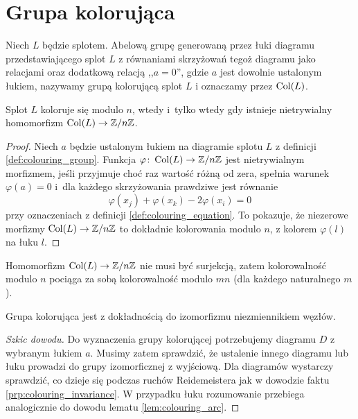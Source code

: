 
\section{Grupa kolorująca}
%

\begin{definition}
\label{def:colouring_group}%
    Niech $L$ będzie splotem.
    Abelową grupę generowaną przez łuki diagramu przedstawiającego splot $L$ z równaniami skrzyżowań tegoż diagramu jako relacjami oraz dodatkową relacją ,,$a = 0$'', gdzie $a$ jest dowolnie ustalonym łukiem, nazywamy grupą kolorującą splot $L$ i oznaczamy przez $\operatorname{Col} (L)$.
\end{definition}

\begin{proposition}
\label{prp:colourings_are_morphisms}%
    Splot $L$ koloruje się modulo $n$, wtedy i~tylko wtedy gdy istnieje nietrywialny homomorfizm $\operatorname{Col}(L) \to \mathbb Z/n\mathbb Z$.
\end{proposition}

\begin{proof}
    Niech $a$ będzie ustalonym łukiem na diagramie splotu $L$ z definicji \ref{def:colouring_group}.
    Funkcja $\varphi \colon \operatorname{Col}(L) \to \mathbb Z/n\mathbb Z$ jest nietrywialnym morfizmem, jeśli przyjmuje choć raz wartość różną od zera, spełnia warunek $\varphi(a) = 0$ i~dla każdego skrzyżowania prawdziwe jest równanie
    \begin{equation}
        \varphi(x_j) + \varphi(x_k) - 2\varphi(x_i) = 0
    \end{equation}
    przy oznaczeniach z definicji \ref{def:colouring_equation}.
    To pokazuje, że niezerowe morfizmy $\operatorname{Col}(L) \to \mathbb Z/n\mathbb Z$ to dokładnie kolorowania modulo $n$, z kolorem $\varphi(l)$ na łuku $l$.
\end{proof}

Homomorfizm $\operatorname{Col} (L) \to \mathbb Z/n\mathbb Z$ nie musi być surjekcją, zatem kolorowalność modulo $n$ pociąga za sobą kolorowalność modulo $mn$ (dla każdego naturalnego $m$).

\begin{proposition}
    Grupa kolorująca jest z dokładnością do izomorfizmu niezmiennikiem węzłów.
\end{proposition}

\begin{proof}[Szkic dowodu]
    Do wyznaczenia grupy kolorującej potrzebujemy diagramu $D$ z wybranym łukiem $a$.
    Musimy zatem sprawdzić, że ustalenie innego diagramu lub łuku prowadzi do grupy izomorficznej z wyjściową.
    Dla diagramów wystarczy sprawdzić, co dzieje się podczas ruchów Reidemeistera jak w dowodzie faktu \ref{prp:colouring_invariance}.
    W przypadku łuku rozumowanie przebiega analogicznie do dowodu lematu \ref{lem:colouring_arc}.
\end{proof}

